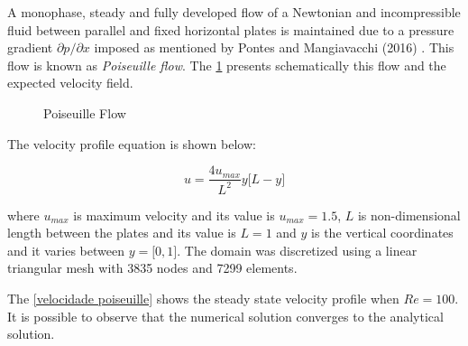 A monophase, steady and fully developed flow of a Newtonian 
and incompressible fluid between parallel and fixed horizontal 
plates is maintained due to a pressure gradient 
$\partial p/ \partial x$ imposed as mentioned by Pontes 
and Mangiavacchi (2016) \cite{pontes2016}. 
This flow is known as \textit{Poiseuille flow}. 
The \ref{poiseuille} presents schematically this flow and 
the expected velocity field.

\begin{figure}[H]
\begin{center}
\end{center}
\caption{Poiseuille Flow}
\label{poiseuille}
\end{figure}

\noindent
The velocity profile equation is shown below:

\begin{equation}
 u = \frac{4 u_{max}}{L^2} y \big[ L - y \big]
\end{equation}

\medskip
\noindent
where $u_{max}$ is maximum velocity and its value is 
$u_{max} = 1.5$, $L$ is non-dimensional length 
between the plates and its value is 
$L = 1$
and $y$ is the vertical coordinates and it varies 
between $y = \big[ 0,1 \big]$.
The domain was discretized using a linear triangular mesh
with 3835 nodes and 7299 elements.

\bigskip
The \ref{velocidade poiseuille} shows the steady state velocity profile
when $Re=100$.
It is possible to observe that the numerical
solution converges to the analytical solution.

